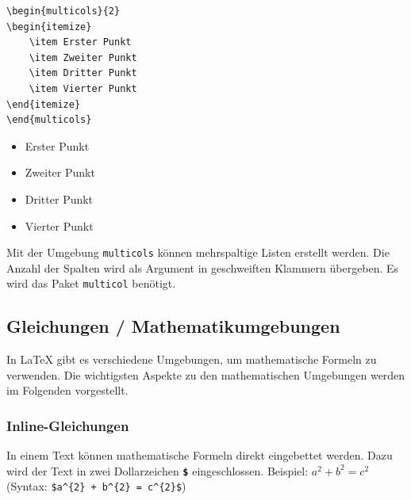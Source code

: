\begin{minipage}{0.50\textwidth}
    \begin{lstlisting}[language={[LaTeX]TeX}]
\begin{multicols}{2}
\begin{itemize}
    \item Erster Punkt
    \item Zweiter Punkt
    \item Dritter Punkt
    \item Vierter Punkt
\end{itemize}
\end{multicols}
\end{lstlisting}
\end{minipage}
\hfill
\begin{minipage}{0.48\textwidth}
    \begin{multicols}{2}
        \begin{itemize}
            \item Erster Punkt
            \item Zweiter Punkt
            \item Dritter Punkt
            \item Vierter Punkt
        \end{itemize}
    \end{multicols}
\end{minipage}

Mit der Umgebung \texttt{multicols} können mehrspaltige Listen erstellt werden. Die Anzahl der Spalten wird als Argument in geschweiften Klammern übergeben. Es wird das Paket \texttt{multicol} benötigt.

\subsection{Gleichungen / Mathematikumgebungen}
In \LaTeX{} gibt es verschiedene Umgebungen, um mathematische Formeln zu verwenden. Die wichtigsten Aspekte zu den mathematischen Umgebungen werden im Folgenden vorgestellt.

\subsubsection{Inline-Gleichungen}
In einem Text können mathematische Formeln direkt eingebettet werden. Dazu wird der Text in zwei Dollarzeichen \texttt{\textbf{\$}} eingeschlossen.
Beispiel: $a^{2} + b^{2} = c^{2}$ (Syntax: \texttt{\$a\textasciicircum\{2\} + b\textasciicircum\{2\} = c\textasciicircum\{2\}\$})

